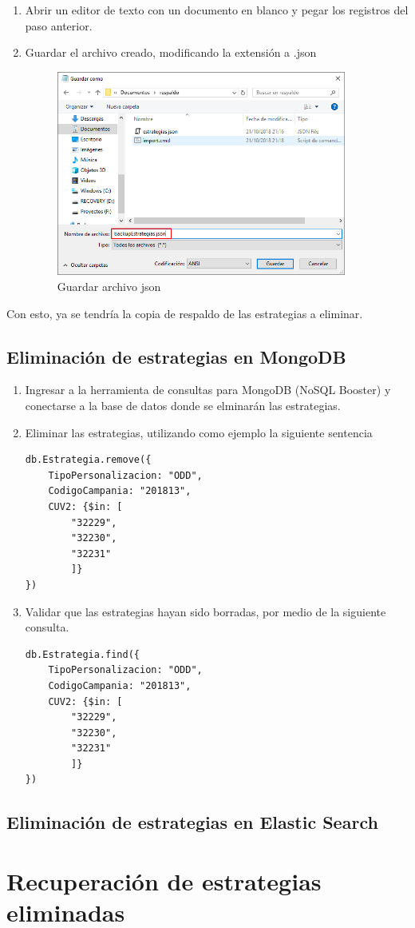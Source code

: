 \documentclass[a4paper,11pt]{paper}
\begin{document}
\begin{enumerate}
\newpage
\item
	Abrir un editor de texto con un documento en blanco y pegar los registros del paso anterior.
\item
	Guardar el archivo creado, modificando la extensión a .json
\begin{figure}[!h]
  \centering
  \includegraphics[width=0.9\textwidth]{imgs/GuardarArchivo.png}
  \caption{Guardar archivo json}
  \end{figure}
\end{enumerate}

Con esto, ya se tendría la copia de respaldo de las estrategias a eliminar.

\subsection{Eliminación de estrategias en MongoDB}

\begin{enumerate}
\def\labelenumi{\arabic{enumi}.}
\item
	Ingresar a la herramienta de consultas para MongoDB (NoSQL Booster) y conectarse a la base de datos donde se elminarán las estrategias.

\item
	Eliminar las estrategias, utilizando como ejemplo la siguiente sentencia
\begin{lstlisting}
db.Estrategia.remove({
    TipoPersonalizacion: "ODD",
    CodigoCampania: "201813",
    CUV2: {$in: [
        "32229",
        "32230",
        "32231"
        ]}
})
\end{lstlisting}
\newpage
\item
	Validar que las estrategias hayan sido borradas, por medio de la siguiente consulta.
\begin{lstlisting}
db.Estrategia.find({
    TipoPersonalizacion: "ODD",
    CodigoCampania: "201813",
    CUV2: {$in: [
        "32229",
        "32230",
        "32231"
        ]}
})
\end{lstlisting}


\end{enumerate}
\subsection{Eliminación de estrategias en Elastic Search}



\newpage
\section{Recuperación de estrategias eliminadas}
%
%
\end{document}
